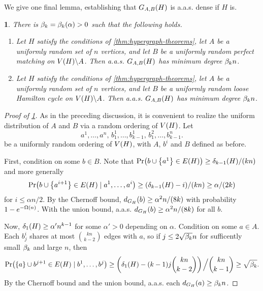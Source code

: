 \documentclass[11pt,english]{article}
\theoremstyle{plain}
\theoremstyle{definition}
\theoremstyle{definition}
\theoremstyle{plain}
\theoremstyle{plain}
\theoremstyle{plain}
\newtheorem{lem}[thm]{\protect\lemmaname}
\theoremstyle{plain}
\theoremstyle{remark}
\theoremstyle{remark}
\let\originalleft\left
\let\originalright\right
\renewcommand{\left}{\mathopen{}\mathclose\bgroup\originalleft}
\renewcommand{\right}{\aftergroup\egroup\originalright}
\providecommand{\lemmaname}{Lemma}
\begin{document}
We give one final lemma, establishing that $G_{A,B}\left(H\right)$ is a.a.s. dense if $H$ is.
\begin{lem}
\label{lem:hypergraph-bipartite-degree-transfer}There is $\a=\a\left(\alpha\right)>0$ such that the following
holds.

\begin{enumerate}[topsep=0px,label=(\alph*)]

\item{\label{itm:hypergraph-bipartite-matching-degree-transfer}Let $H$ satisfy the conditions of \ref{thm:hypergraph-theorems},
let $A$ be a uniformly random set of $n$ vertices, and let $B$
be a uniformly random perfect matching on $V\left(H\right)\backslash A$.
Then a.a.s. $G_{A,B}\left(H\right)$ has minimum degree $\beta_k n$.}

\item{\label{itm:hypergraph-bipartite-cycle-degree-transfer}Let $H$ satisfy the conditions of \ref{thm:hypergraph-theorems},
let $A$ be a uniformly random set of $n$ vertices, and let $B$
be a uniformly random loose Hamilton cycle on $V\left(H\right)\backslash A$.
Then a.a.s. $G_{A,B}\left(H\right)$ has minimum degree $\beta_k n$.}

\end{enumerate}\end{lem}
\begin{proof}
[Proof of \ref{lem:hypergraph-bipartite-degree-transfer}]As in the preceding discussion, it is convenient to realize the uniform
distribution of $A$ and $B$ via a random ordering of $V\left(H\right)$.
Let 
\[
a^{1},\dots,a^{n},\, b_{1}^{1},\dots,b_{k-1}^{1},\, b_{1}^{2},\dots,b_{k-1}^{n}.
\]
be a uniformly random ordering of $V\left(H\right)$, with $A$, $b^i$ and
$B$ defined as before.

First, condition on some $b\in B$. Note that $\Pr\left(b\cup\left\{ a^{1}\right\} \in E\left(H\right)\right)\ge\delta_{k-1}\left(H\right)/\left(kn\right)$
and more generally 
\[
\Pr\left(b\cup\left\{ a^{i+1}\right\} \in E\left(H\right)\mid a^{1},\dots,a^{i}\right)\ge\left(\delta_{k-1}\left(H\right)-i\right)/\left(kn\right)\ge\alpha/\left(2k\right)
\]
for $i\le\alpha n/2$. By the Chernoff bound, $d_{G_{H}}\left(b\right)\ge\alpha^{2}n/\left(8k\right)$
with probability $1-e^{-\Omega\left(n\right)}$. With the union bound, a.a.s. $d_{G_{H}}\left(b\right)\ge\alpha^{2}n/\left(8k\right)$ for all $b$.

Now, $\delta_{1}\left(H\right)\ge\alpha'n^{k-1}$ for some $\alpha'>0$
depending on $\alpha$. Condition on some $a\in A$. Each $b_{j}^{i}$
shares at most ${kn \choose k-2}$ edges with $a$, so if $j\le2\sqrt{\beta_k}n$
for sufficently small $\beta_k$ and large $n$,
then
\[
\Pr\left(\left\{ a\right\} \cup b^{j+1}\in E\left(H\right)\mid b^{1},\dots,b^{j}\right)\ge\left(\delta_{1}\left(H\right)-\left(k-1\right)j{kn \choose k-2}\right)\left.\vphantom{\sum}\right/{kn \choose k-1}\ge\sqrt{\amat}.
\]
By the Chernoff bound and the union bound, a.a.s. each $d_{G_{H}}\left(a\right)\ge\amat n$.
\end{proof}
\end{document}
